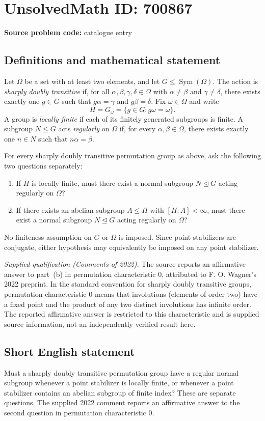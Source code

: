 \documentclass[11pt]{article}
\begin{document}
\section*{UnsolvedMath ID: 700867}
\textbf{Source problem code:} catalogue entry
\subsection{Definitions and mathematical statement}
Let \(\Omega\) be a set with at least two elements, and let \(G\leq\operatorname{Sym}(\Omega)\). The action is \emph{sharply doubly transitive} if, for all \(\alpha,\beta,\gamma,\delta\in\Omega\) with \(\alpha\neq\beta\) and \(\gamma\neq\delta\), there exists exactly one \(g\in G\) such that \(g\alpha=\gamma\) and \(g\beta=\delta\). Fix \(\omega\in\Omega\) and write
\[
H=G_\omega=\{g\in G:g\omega=\omega\}.
\]
A group is \emph{locally finite} if each of its finitely generated subgroups is finite. A subgroup \(N\leq G\) acts \emph{regularly} on \(\Omega\) if, for every \(\alpha,\beta\in\Omega\), there exists exactly one \(n\in N\) such that \(n\alpha=\beta\).

For every sharply doubly transitive permutation group as above, ask the following two questions separately:
\begin{enumerate}
\item[(a)] If \(H\) is locally finite, must there exist a normal subgroup \(N\trianglelefteq G\) acting regularly on \(\Omega\)?
\item[(b)] If there exists an abelian subgroup \(A\leq H\) with \([H:A]<\infty\), must there exist a normal subgroup \(N\trianglelefteq G\) acting regularly on \(\Omega\)?
\end{enumerate}
No finiteness assumption on \(G\) or \(\Omega\) is imposed. Since point stabilizers are conjugate, either hypothesis may equivalently be imposed on any point stabilizer.

\emph{Supplied qualification (Comments of 2022).} The source reports an affirmative answer to part~(b) in permutation characteristic \(0\), attributed to F. O. Wagner's 2022 preprint. In the standard convention for sharply doubly transitive groups, permutation characteristic \(0\) means that involutions (elements of order two) have a fixed point and the product of any two distinct involutions has infinite order. The reported affirmative answer is restricted to this characteristic and is supplied source information, not an independently verified result here.
\subsection{Short English statement}
Must a sharply doubly transitive permutation group have a regular normal subgroup whenever a point stabilizer is locally finite, or whenever a point stabilizer contains an abelian subgroup of finite index? These are separate questions. The supplied 2022 comment reports an affirmative answer to the second question in permutation characteristic \(0\).
\end{document}
